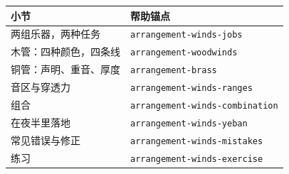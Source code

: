 \begin{helpmapping}
\begin{longtable}{p{}p{}}
\toprule
小节 & 帮助锚点 \\
\midrule
两组乐器，两种任务 & \texttt{arrangement-winds-jobs} \\
木管：四种颜色，四条线 & \texttt{arrangement-woodwinds} \\
铜管：声明、重音、厚度 & \texttt{arrangement-brass} \\
音区与穿透力 & \texttt{arrangement-winds-ranges} \\
组合 & \texttt{arrangement-winds-combination} \\
在夜半里落地 & \texttt{arrangement-winds-yeban} \\
常见错误与修正 & \texttt{arrangement-winds-mistakes} \\
练习 & \texttt{arrangement-winds-exercise} \\
\bottomrule
\end{longtable}
\end{helpmapping}
